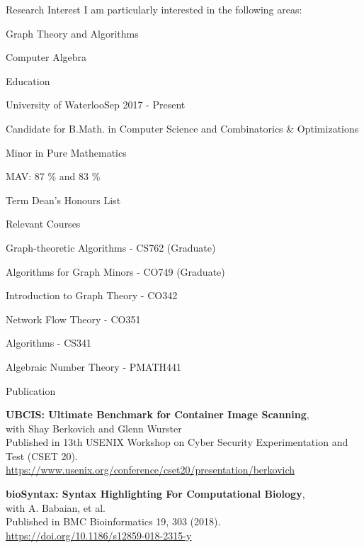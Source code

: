 \documentclass{cv}
\begin{document}
\begin{rSection}{Research Interest}
I am particularly interested in the following areas:
\begin{rSubsectionPure}
	\item Graph Theory and Algorithms
	\item Computer Algebra
\end{rSubsectionPure}
\end{rSection}

\begin{rSection}{Education}
\begin{rSubsection}{University of Waterloo}{Sep 2017 - Present}{}{}
	\item Candidate for B.Math. in Computer Science and Combinatorics \& Optimizations
	\item Minor in Pure Mathematics
	\item MAV: 87 \% and 83 \%
	\item Term Dean's Honours List
\end{rSubsection}

\begin{rSubsection}{Relevant Courses}{}{}{}
  \item Graph-theoretic Algorithms - CS762 (Graduate)
  \item Algorithms for Graph Minors - CO749 (Graduate)
  \item Introduction to Graph Theory - CO342
  \item Network Flow Theory - CO351
  \item Algorithms - CS341
  \item Algebraic Number Theory - PMATH441
\end{rSubsection}
\end{rSection}

\begin{rSection}{Publication}
\begin{rSubsectionPure}
	\item \textbf{{UBCIS}: Ultimate Benchmark for Container Image Scanning}, \\
	with Shay Berkovich and Glenn Wurster \\
	Published in 13th {USENIX} Workshop on Cyber Security Experimentation and Test ({CSET} 20). \\
	\href{https://www.usenix.org/conference/cset20/presentation/berkovich}{https://www.usenix.org/conference/cset20/presentation/berkovich}
\end{rSubsectionPure}

\begin{rSubsectionPure}
	\item \textbf{bioSyntax: Syntax Highlighting For Computational Biology}, \\
	with A. Babaian, et al. \\
	Published in BMC Bioinformatics 19, 303 (2018). \\
	\href{https://doi.org/10.1186/s12859-018-2315-y}{https://doi.org/10.1186/s12859-018-2315-y}
\end{rSubsectionPure}
\end{rSection}
\end{document}
